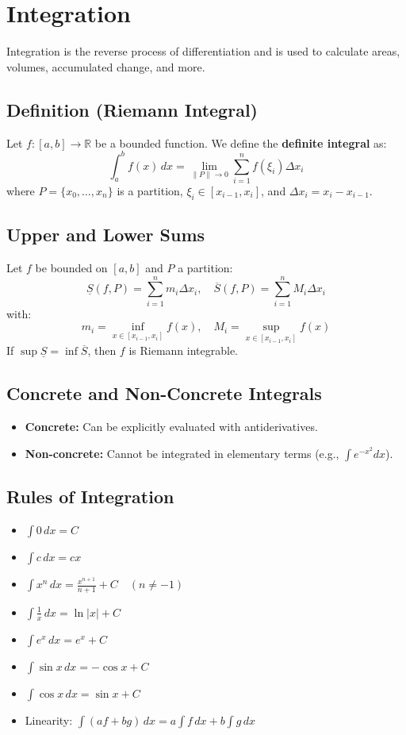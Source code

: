 \section{Integration}

Integration is the reverse process of differentiation and is used to calculate areas, volumes, accumulated change, and more.

\subsection{Definition (Riemann Integral)}

Let \(f: [a, b] \to \mathbb{R}\) be a bounded function. We define the \textbf{definite integral} as:
\[
\int_a^b f(x)\,dx = \lim_{\|P\| \to 0} \sum_{i=1}^n f(\xi_i)\Delta x_i
\]
where \(P = \{x_0, \dots, x_n\}\) is a partition, \(\xi_i \in [x_{i-1}, x_i]\), and \(\Delta x_i = x_i - x_{i-1}\).

\subsection{Upper and Lower Sums}

Let \(f\) be bounded on \([a, b]\) and \(P\) a partition:
\[
\underline{S}(f, P) = \sum_{i=1}^n m_i \Delta x_i, \quad
\overline{S}(f, P) = \sum_{i=1}^n M_i \Delta x_i
\]
with:
\[
m_i = \inf_{x \in [x_{i-1}, x_i]} f(x), \quad
M_i = \sup_{x \in [x_{i-1}, x_i]} f(x)
\]
If \(\sup \underline{S} = \inf \overline{S}\), then \(f\) is Riemann integrable.

\subsection{Concrete and Non-Concrete Integrals}

\begin{itemize}[label=\(-\)]
\item \textbf{Concrete:} Can be explicitly evaluated with antiderivatives.
\item \textbf{Non-concrete:} Cannot be integrated in elementary terms (e.g., \(\int e^{-x^2} dx\)).
\end{itemize}

\subsection{Rules of Integration}

\begin{itemize}[label=\(-\)]
\item \(\int 0\,dx = C\)
\item \(\int c\,dx = cx\)
\item \(\int x^n\,dx = \frac{x^{n+1}}{n+1} + C \quad (n \ne -1)\)
\item \(\int \frac{1}{x}\,dx = \ln|x| + C\)
\item \(\int e^x\,dx = e^x + C\)
\item \(\int \sin x\,dx = -\cos x + C\)
\item \(\int \cos x\,dx = \sin x + C\)
\item Linearity: \(\int (af + bg)\,dx = a\int f\,dx + b\int g\,dx\)
\end{itemize}

